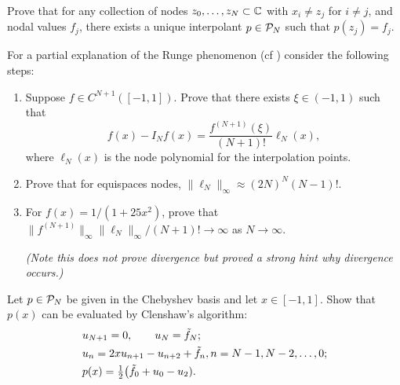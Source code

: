 


   

\begin{exercise} Prove that for any
   collection of nodes $z_0, \dots, z_N \subset \mathbb{C}$ with $x_i \neq z_j$  for $i
   \neq j$, and nodal values $f_j$, there exists a unique interpolant $p \in
   \mathcal{P}_N$ such that $p(z_j) = f_j$. 
\end{exercise}

\begin{exercise}
   \label{exr:poly:Runge Phenomenon}
   For a partial explanation of the Runge phenomenon (cf \nbpoly) consider 
   the following steps: 
   \begin{enumerate} \ilist 
      \item Suppose $f \in C^{N+1}([-1,1])$. Prove that there exists 
      $\xi \in (-1,1)$ such that 
      \[
         f(x) - I_N f(x) =  \frac{f^{(N+1)}(\xi)}{(N+1)!} 
            \ell_N(x),
      \]
      where $\ell_N(x)$ is the node polynomial for the interpolation points. 
      \item Prove that for equispaces nodes, 
      $\|\ell_N\|_\infty \approx (2N)^{N} (N-1)!$.
      \item For $f(x) = 1 / (1+25 x^2)$, prove that 
       $\| f^{(N+1)} \|_\infty \| \ell_N \|_\infty  / (N+1)! \to 
       \infty$ as $N \to \infty$.

       {\it (Note this does not prove divergence but proved a strong 
       hint why divergence occurs.)}
   \end{enumerate}
\end{exercise}


\begin{exercise}
   \label{exr:poly:clenshaw}
   Let $p \in \mathcal{P}_N$ be given in the Chebyshev basis and let $x \in [-1,1]$. 
   Show that $p(x)$ can be evaluated by Clenshaw's algorithm:
   \begin{align*}
      & u_{N+1} = 0, \qquad u_N = \tilde{f}_N; \\ 
      & u_n = 2 x u_{n+1} - u_{n+2} + \tilde{f}_n, n = N-1, N-2, \dots, 0; \\ 
      & p(x) = {\textstyle \frac{1}{2}} \big( \tilde{f}_0 + u_0 - u_2).
   \end{align*}
\end{exercise}


